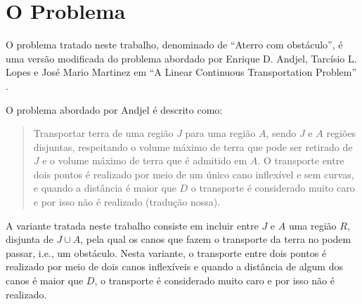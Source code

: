 %
%
%

\section{O Problema}
O problema tratado neste trabalho, denominado de ``Aterro com obstáculo'', é uma
versão modificada do problema abordado por Enrique D. Andjel, Tarcísio L. Lopes
e José Mario Martinez em ``A Linear Continuous Transportation Problem''
\cite{Andjel:1989:TP}.

O problema abordado por Andjel é descrito como:
\begin{quotation}
    Transportar terra de uma região $J$ para uma região $A$, sendo $J$ e $A$
    regiões disjuntas, respeitando o volume máximo de terra que pode ser
    retirado de $J$ e o volume máximo de terra que é admitido em $A$. O
    transporte entre dois pontos é realizado por meio de um único cano
    inflexível e sem curvas, e quando a distância é maior que $D$ o
    transporte é considerado muito caro e por isso não é realizado (tradução
    nossa).
\end{quotation}

A variante tratada neste trabalho consiste em incluir entre $J$ e $A$ uma 
região $R$, disjunta de $J \cup A$, pela qual os canos que fazem o transporte da
terra no podem passar, i.e., um obstáculo. Nesta variante, o transporte entre
dois pontos é realizado por meio de dois canos inflexíveis e quando a distância
de algum dos canos é maior que $D$, o transporte é considerado muito caro e por
isso não é realizado.
